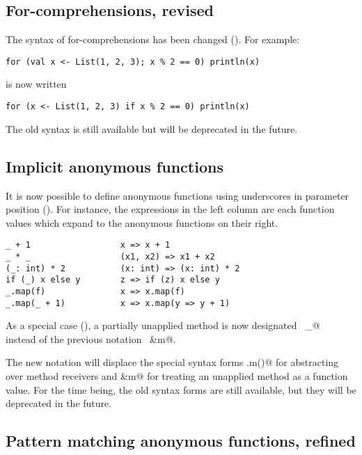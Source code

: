 \subsection*{For-comprehensions, revised}

The syntax of for-comprehensions has been changed (). For example:

\begin{lstlisting}
for (val x <- List(1, 2, 3); x % 2 == 0) println(x)
\end{lstlisting}

is now written

\begin{lstlisting}
for (x <- List(1, 2, 3) if x % 2 == 0) println(x)
\end{lstlisting}

The old syntax is still available but will be deprecated in the
future. 

\subsection*{Implicit anonymous functions}

It is now possible to define anonymous functions 
using underscores in parameter position ().
For instance, 
the expressions in the left column are each function values which 
expand to the anonymous functions on their right.
\begin{lstlisting}
_ + 1                  x => x + 1
_ * _                  (x1, x2) => x1 + x2
(_: int) * 2           (x: int) => (x: int) * 2
if (_) x else y        z => if (z) x else y
_.map(f)               x => x.map(f)
_.map(_ + 1)           x => x.map(y => y + 1)
\end{lstlisting}
As a special case (), a partially unapplied method is now designated
~\lstinline@m _@~~ instead of the previous notation ~\lstinline@&m@.

The new notation will displace the special syntax forms
\lstinline@.m()@ for abstracting over method receivers and
\lstinline@&m@ for treating an unapplied method as a function value.
For the time being, the old syntax forms are still available, 
but they will be deprecated in the future.

\subsection*{Pattern matching anonymous functions, refined}

